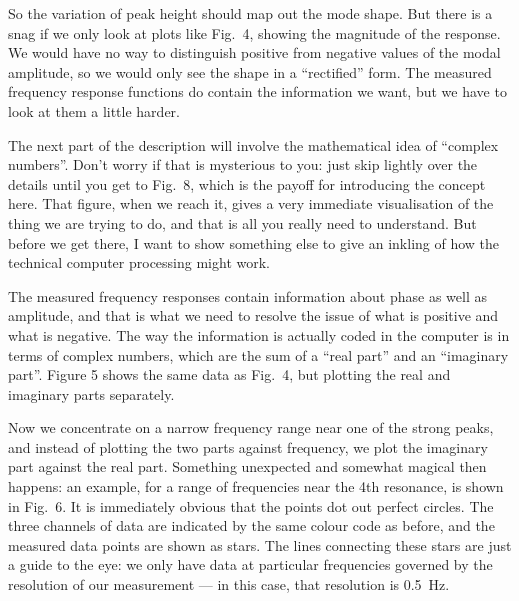  So the variation of peak height should map out the mode shape. But there is a 
  snag if we only look at plots like Fig.\ 4, showing the magnitude of the 
  response. We would have no way to distinguish positive from negative values 
  of the modal amplitude, so we would only see the shape in a “rectified” form. 
  The measured frequency response functions do contain the information we want, 
  but we have to look at them a little harder. 

  The next part of the description will involve the mathematical idea of 
  “complex numbers”. Don’t worry if that is mysterious to you: just skip 
  lightly over the details until you get to Fig.\ 8, which is the payoff for 
  introducing the concept here. That figure, when we reach it, gives a very 
  immediate visualisation of the thing we are trying to do, and that is all you 
  really need to understand. But before we get there, I want to show something 
  else to give an inkling of how the technical computer processing might work. 

  The measured frequency responses contain information about phase as well as 
  amplitude, and that is what we need to resolve the issue of what is positive 
  and what is negative. The way the information is actually coded in the 
  computer is in terms of complex numbers, which are the sum of a “real part” 
  and an “imaginary part”. Figure 5 shows the same data as Fig.\ 4, but 
  plotting the real and imaginary parts separately. 

  Now we concentrate on a narrow frequency range near one of the strong peaks, 
  and instead of plotting the two parts against frequency, we plot the 
  imaginary part against the real part. Something unexpected and somewhat 
  magical then happens: an example, for a range of frequencies near the 4th 
  resonance, is shown in Fig.\ 6. It is immediately obvious that the points dot 
  out perfect circles. The three channels of data are indicated by the same 
  colour code as before, and the measured data points are shown as stars. The 
  lines connecting these stars are just a guide to the eye: we only have data 
  at particular frequencies governed by the resolution of our measurement — in 
  this case, that resolution is 0.5~Hz. 


